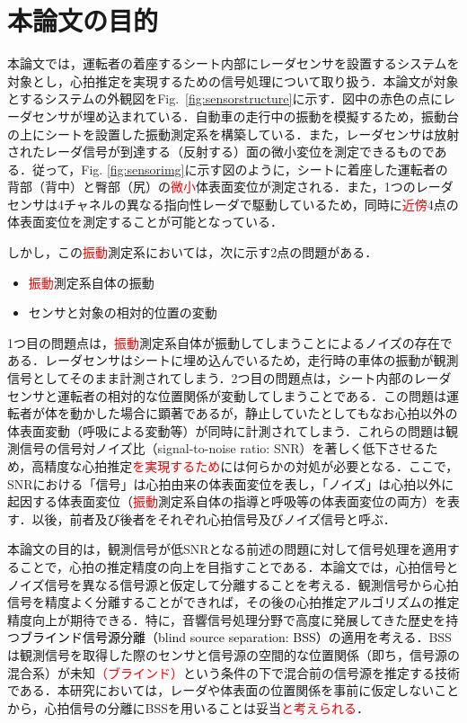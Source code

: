 \section{本論文の目的}
本論文では，運転者の着座するシート内部にレーダセンサを設置するシステムを対象とし，心拍推定を実現するための信号処理について取り扱う．本論文が対象とするシステムの外観図をFig.~\ref{fig:sensorstructure}に示す．図中の赤色の点にレーダセンサが埋め込まれている．自動車の走行中の振動を模擬するため，振動台の上にシートを設置した振動測定系を構築している．また，レーダセンサは放射されたレーダ信号が到達する（反射する）面の微小変位を測定できるものである．従って，Fig. \ref{fig:sensorimg}に示す図のように，シートに着座した運転者の背部（背中）と臀部（尻）の\textcolor{red}{微小}体表面変位が測定される．また，1つのレーダセンサは4チャネルの異なる指向性レーダで駆動しているため，同時に\textcolor{red}{近傍}4点の体表面変位を測定することが可能となっている．

しかし，この\textcolor{red}{振動}測定系においては，次に示す2点の問題がある．
\begin{itemize}
	\item \textcolor{red}{振動}測定系自体の振動
	\item センサと対象の相対的位置の変動
\end{itemize}
1つ目の問題点は，\textcolor{red}{振動}測定系自体が振動してしまうことによるノイズの存在である．レーダセンサはシートに埋め込んでいるため，走行時の車体の振動が観測信号としてそのまま計測されてしまう．2つ目の問題点は，シート内部のレーダセンサと運転者の相対的な位置関係が変動してしまうことである．この問題は運転者が体を動かした場合に顕著であるが，静止していたとしてもなお心拍以外の体表面変動（呼吸による変動等）が同時に計測されてしまう．これらの問題は観測信号の信号対ノイズ比（signal-to-noise ratio: SNR）を著しく低下させるため，高精度な心拍推定\textcolor{red}{を実現するため}には何らかの対処が必要となる．ここで，SNRにおける「信号」は心拍由来の体表面変位を表し，「ノイズ」は心拍以外に起因する体表面変位（\textcolor{red}{振動}測定系自体の指導と呼吸等の体表面変位の両方）を表す．以後，前者及び後者をそれぞれ心拍信号及びノイズ信号と呼ぶ．

本論文の目的は，観測信号が低SNRとなる前述の問題に対して信号処理を適用することで，心拍の推定精度の向上を目指すことである．本論文では，心拍信号とノイズ信号を異なる信号源と仮定して分離することを考える．観測信号から心拍信号を精度よく分離することができれば，その後の心拍推定アルゴリズムの推定精度向上が期待できる．特に，音響信号処理分野で高度に発展してきた歴史を持つ\textcolor{black}{ブラインド信号源分離（blind source separation: BSS）}\cite{originica, ica2}の適用を考える．BSSは観測信号を取得した際のセンサと信号源の空間的な位置関係（即ち，信号源の混合系）が未知\textcolor{red}{（ブラインド）}という条件の下で混合前の信号源を推定する技術である．本研究においては，レーダや体表面の位置関係を事前に仮定しないことから，心拍信号の分離にBSSを用いることは妥当\textcolor{red}{と考えられる}．

